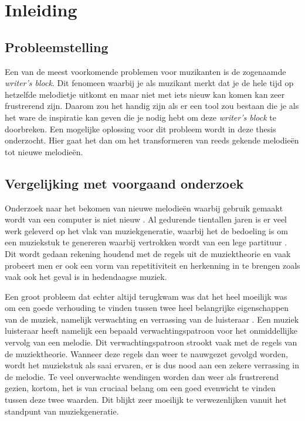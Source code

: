 \chapter{Inleiding}
\label{hoofdstuk:I}


\section{Probleemstelling}
Een van de meest voorkomende problemen voor muzikanten is de zogenaamde \textit{writer's block}. Dit fenomeen waarbij je als muzikant merkt dat je de hele tijd op hetzelfde melodietje uitkomt en maar niet met iets nieuw kan komen kan zeer frustrerend zijn. Daarom zou het handig zijn als er een tool zou bestaan die je als het ware de inspiratie kan geven die je nodig hebt om deze \textit{writer's block} te doorbreken. Een mogelijke oplossing voor dit probleem wordt in deze thesis onderzocht. Hier gaat het dan om het transformeren van reeds gekende melodie\"en tot nieuwe melodie\"en.

\section{Vergelijking met voorgaand onderzoek}
Onderzoek naar het bekomen van nieuwe melodie\"en waarbij gebruik gemaakt wordt van een computer is niet nieuw \cite{thesis:thomas} \cite{book:musicAndProbability}. Al gedurende tientallen jaren is er veel werk geleverd op het vlak van muziekgeneratie, waarbij het de bedoeling is om een muziekstuk te genereren waarbij vertrokken wordt van een lege partituur \cite{book:musicGeeksNerds}. Dit wordt gedaan rekening houdend met de regels uit de muziektheorie en vaak probeert men er ook een vorm van repetitiviteit en herkenning in te brengen zoals vaak ook het geval is in hedendaagse muziek. 

Een groot probleem dat echter altijd terugkwam was dat het heel moeilijk was om een goede verhouding te vinden tussen twee heel belangrijke eigenschappen van de muziek, namelijk verwachting en verrassing van de luisteraar \cite{book:musimathics}. Een muziek luisteraar heeft namelijk een bepaald verwachtingspatroon voor het onmiddellijke vervolg van een melodie. Dit verwachtingspatroon strookt vaak met de regels van de muziektheorie. Wanneer deze regels dan weer te nauwgezet gevolgd worden, wordt het muziekstuk als saai ervaren, er is dus nood aan een zekere verrassing in de melodie. Te veel onverwachte wendingen worden dan weer als frustrerend gezien, kortom, het is van cruciaal belang om een goed evenwicht te vinden tussen deze twee waarden. Dit blijkt zeer moeilijk te verwezenlijken vanuit het standpunt van muziekgeneratie.\\

